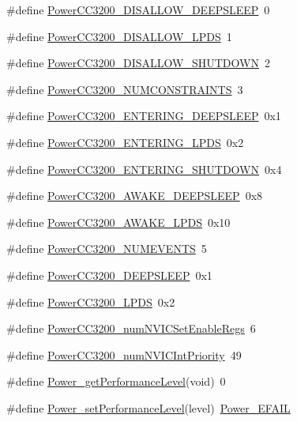 \begin{DoxyCompactItemize}
\#define \hyperlink{_power_c_c3200_8h_a16c8b9c71bd05323c2bbe77e6995c76a}{Power\+C\+C3200\+\_\+\+D\+I\+S\+A\+L\+L\+O\+W\+\_\+\+D\+E\+E\+P\+S\+L\+E\+E\+P}~0
\item 
\#define \hyperlink{_power_c_c3200_8h_aacd11ea9110be7f3105c5b009b2e8a4e}{Power\+C\+C3200\+\_\+\+D\+I\+S\+A\+L\+L\+O\+W\+\_\+\+L\+P\+D\+S}~1
\item 
\#define \hyperlink{_power_c_c3200_8h_a7770161a9943a0a52ff5d7bac34283ef}{Power\+C\+C3200\+\_\+\+D\+I\+S\+A\+L\+L\+O\+W\+\_\+\+S\+H\+U\+T\+D\+O\+W\+N}~2
\item 
\#define \hyperlink{_power_c_c3200_8h_a5bcb1d540c69969ce4859150dabd5bad}{Power\+C\+C3200\+\_\+\+N\+U\+M\+C\+O\+N\+S\+T\+R\+A\+I\+N\+T\+S}~3
\item 
\#define \hyperlink{_power_c_c3200_8h_afb9f252dfb4df97bd49c413f854db433}{Power\+C\+C3200\+\_\+\+E\+N\+T\+E\+R\+I\+N\+G\+\_\+\+D\+E\+E\+P\+S\+L\+E\+E\+P}~0x1
\item 
\#define \hyperlink{_power_c_c3200_8h_a44e07da2b7439b7c0f060c82ef6c3f84}{Power\+C\+C3200\+\_\+\+E\+N\+T\+E\+R\+I\+N\+G\+\_\+\+L\+P\+D\+S}~0x2
\item 
\#define \hyperlink{_power_c_c3200_8h_a4138cf97a705ea4df43440739f64cf32}{Power\+C\+C3200\+\_\+\+E\+N\+T\+E\+R\+I\+N\+G\+\_\+\+S\+H\+U\+T\+D\+O\+W\+N}~0x4
\item 
\#define \hyperlink{_power_c_c3200_8h_a0ac3cb7ceb2db8ff79f9bfb11fa79bcc}{Power\+C\+C3200\+\_\+\+A\+W\+A\+K\+E\+\_\+\+D\+E\+E\+P\+S\+L\+E\+E\+P}~0x8
\item 
\#define \hyperlink{_power_c_c3200_8h_ada9b64eb549b6eefb3f926dce1b0ac21}{Power\+C\+C3200\+\_\+\+A\+W\+A\+K\+E\+\_\+\+L\+P\+D\+S}~0x10
\item 
\#define \hyperlink{_power_c_c3200_8h_ae654f226518fc563d284e73e52783e48}{Power\+C\+C3200\+\_\+\+N\+U\+M\+E\+V\+E\+N\+T\+S}~5
\item 
\#define \hyperlink{_power_c_c3200_8h_ac2e501ffd25e6ae70acd5287c8fe9ec0}{Power\+C\+C3200\+\_\+\+D\+E\+E\+P\+S\+L\+E\+E\+P}~0x1
\item 
\#define \hyperlink{_power_c_c3200_8h_a7875b03538297965cb7bd69a3fd420e3}{Power\+C\+C3200\+\_\+\+L\+P\+D\+S}~0x2
\item 
\#define \hyperlink{_power_c_c3200_8h_ae8be40b57cc2977d11d8e433905626b0}{Power\+C\+C3200\+\_\+num\+N\+V\+I\+C\+Set\+Enable\+Regs}~6
\item 
\#define \hyperlink{_power_c_c3200_8h_aa9308e92f793082775a42d2dc7f62098}{Power\+C\+C3200\+\_\+num\+N\+V\+I\+C\+Int\+Priority}~49
\item 
\#define \hyperlink{_power_c_c3200_8h_a33c66d2d8a05f50274105eef817c41b0}{Power\+\_\+get\+Performance\+Level}(void)~0
\item 
\#define \hyperlink{_power_c_c3200_8h_a5c634ae909d29db6dd48c6bd104b62e5}{Power\+\_\+set\+Performance\+Level}(level)~\hyperlink{_power_8h_aed2f92a8c72bfa183e14d10a2e35789f}{Power\+\_\+\+E\+F\+A\+I\+L}
\end{DoxyCompactItemize}
